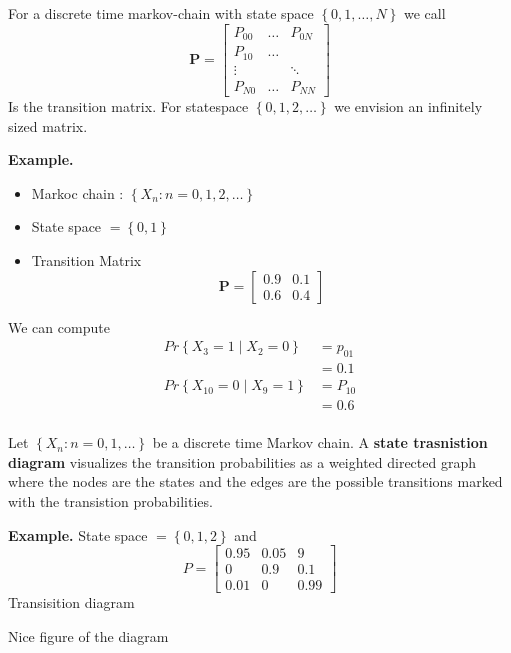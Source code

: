 \documentclass{article}
\theoremstyle{remark}
\begin{document}
\begin{definition} \quad
  For a discrete time markov-chain with state space $\left \{ 0,1, \ldots, N \right \}$ we call
  \[
  \mathbf{P} = \begin{bmatrix}
    P_{00} & \ldots & P_{0N} \\
    P_{10}  & \ldots \\
    \vdots  &   &  \ddots \\
    P_{N0} & \ldots & P_{NN}
  \end{bmatrix}
  \]
  Is the transition matrix.
  For statespace $\left\{ 0,1,2, \ldots \right\}$ we envision an infinitely sized matrix.
\end{definition}

 \begin{tcolorbox}
   \textbf{Example.}
   \begin{itemize}
     \item Markoc chain : $\left\{ X_{n} : n = 0,1,2,\ldots \right\}$
     \item State space  $= \left\{ 0,1 \right\}$
     \item Transition Matrix \[
     \mathbf{P} = \begin{bmatrix}
     0.9  &  0.1 \\
     0.6  &  0.4
     \end{bmatrix}
     \]
   \end{itemize}
   We can compute \[
     \begin{split}
        Pr \left \{ X_{3} = 1  \mid  X_{2} = 0 \right \} &=  p_{01} \\
        &= 0.1   \\
        Pr \left \{ X_{10} = 0  \mid  X_{9} = 1 \right \} &=  P_{10} \\
        &= 0.6  \\
     \end{split}
   \]
 \end{tcolorbox}

\begin{definition}
  Let $\left\{ X_{n}: n = 0,1, \ldots \right\}$ be a discrete time Markov chain.  A \textbf{state trasnistion diagram} visualizes the transition probabilities as a weighted directed graph where the nodes are the states and the edges are the possible transitions marked with the transistion probabilities.
\end{definition}

\begin{tcolorbox}
  \textbf{Example.} State space $= \left\{ 0,1,2 \right\}$ and \[
  P = \begin{bmatrix}
  0.95  & 0.05 & 9 \\
  0  & 0.9  &  0.1 \\
  0.01  &  0  &  0.99
  \end{bmatrix}
  \]
  Transisition diagram
  \begin{tcolorbox}
    Nice figure of the diagram
  \end{tcolorbox}
\end{tcolorbox}
\end{document}
